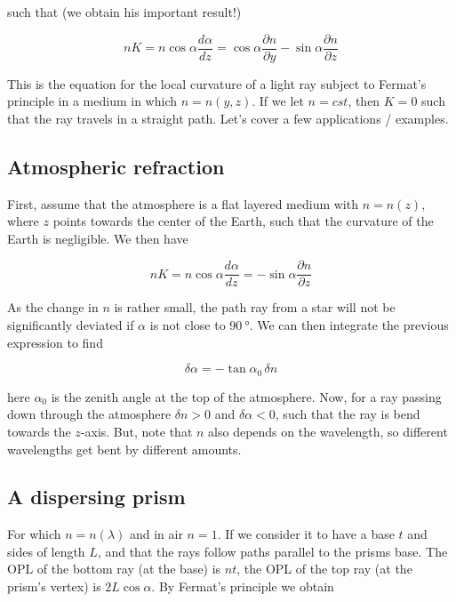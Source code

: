 \documentclass[a4paper]{article}
\begin{document}
such that (we obtain his important result!)

\begin{equation}
    nK=n\cos\alpha\frac{d\alpha}{dz}=\cos\alpha\frac{\partial n}{\partial y}-\sin\alpha\frac{\partial n}{\partial z}
\end{equation}

This is the equation for the local curvature of a light ray subject to Fermat's principle in a medium in which $n=n(y,z)$. If we let $n=cst$, then $K=0$ such that the ray travels in a straight path. Let's cover a few applications / examples.

\subsection{Atmospheric refraction}

First, assume that the atmosphere is a flat layered medium with $n=n(z)$, where $z$ points towards the center of the Earth, such that the curvature of the Earth is negligible. We then have

\begin{equation}
    nK=n\cos\alpha\frac{d\alpha}{dz}=-\sin\alpha\frac{\partial n}{\partial z}
\end{equation}

As the change in $n$ is rather small, the path ray from a star will not be significantly deviated if $\alpha$ is not close to $90\ \si{\degree}$. We can then integrate the previous expression to find

\begin{equation}
    \delta\alpha=-\tan\alpha_0\,\delta n
\end{equation}

here $\alpha_0$ is the zenith angle at the top of the atmosphere. Now, for a ray passing down through the atmosphere $\delta n>0$ and $\delta\alpha < 0$, such that the ray is bend towards the $z$-axis. But, note that $n$ also depends on the wavelength, so different wavelengths get bent by different amounts.

\subsection{A dispersing prism}

For which $n=n(\lambda)$ and in air $n=1$. If we consider it to have a base $t$ and sides of length $L$, and that the rays follow paths parallel to the prisms base. The OPL of the bottom ray (at the base) is $nt$, the OPL of the top ray (at the prism's vertex) is $2L\cos\alpha$. By Fermat's principle we obtain
\end{document}
